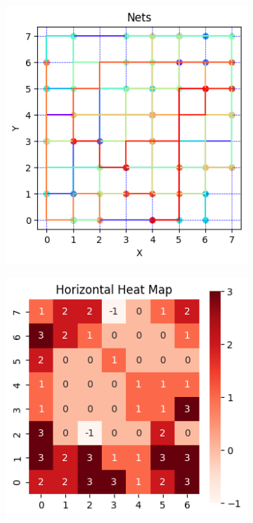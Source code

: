 \documentclass[conference]{IEEEtran}
\begin{document}
\begin{figure}[h!]
\begin{subfigure}[b]{0.35\textwidth}
        \caption{}
    \end{subfigure}
    \begin{subfigure}[b]{0.31\textwidth}
        \includegraphics[width=\textwidth]{figures/rl_solution.png}
        \caption{}
    \end{subfigure}
    \begin{subfigure}[b]{0.31\textwidth}
        \includegraphics[width=\textwidth]{figures/as_hhm.png}

\end{subfigure}
\end{figure}
\end{document}
